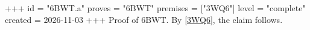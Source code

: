 +++
id = "6BWT.a"
proves = "6BWT"
premises = ["3WQ6"]
level = "complete"
created = 2026-11-03
+++
Proof of 6BWT. By \ref{3WQ6}, the claim follows.
